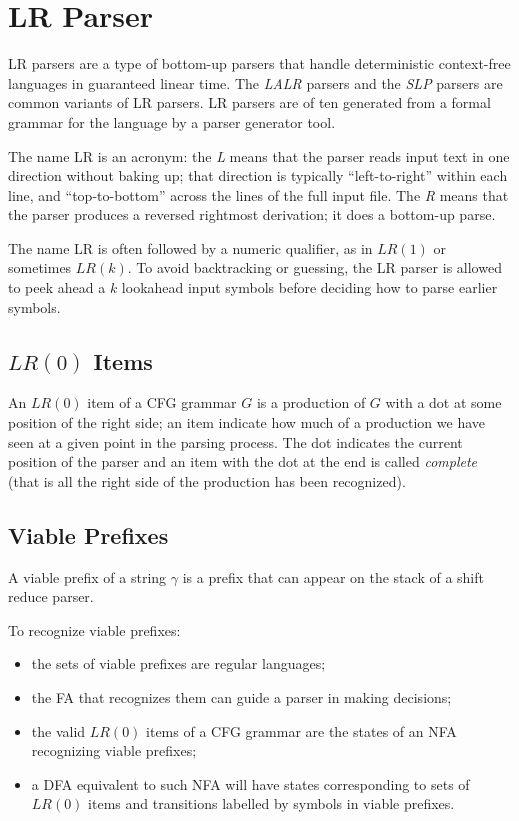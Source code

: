 \section{LR Parser}
LR parsers are a type of bottom-up parsers that handle deterministic context-free languages in guaranteed linear time.
The \emph{LALR} parsers and the \emph{SLP} parsers are common variants of LR parsers.
LR parsers are of ten generated from a formal grammar for the language by a parser generator tool.

The name LR is an acronym: the \emph{L} means that the parser reads input text in one direction without baking up; that direction is typically ``left-to-right'' within each line, and ``top-to-bottom'' across the lines of the full input file.
The \emph{R} means that the parser produces a reversed rightmost derivation; it does a bottom-up parse.

The name LR is often followed by a numeric qualifier, as in $LR(1)$ or sometimes $LR(k)$.
To avoid backtracking or guessing, the LR parser is allowed to peek ahead a $k$ lookahead input symbols before deciding how to parse earlier symbols.

\subsection{$LR(0)$ Items}
An $LR(0)$ item of a CFG grammar $G$ is a production of $G$ with a dot at some position of the right side; an item indicate how much of a production we have seen at a given point in the parsing process.
The dot indicates the current position of the parser and an item with the dot at the end is called \emph{complete} (that is all the right side of the production has been recognized).

\subsection{Viable Prefixes}
A viable prefix of a string $\gamma$ is a prefix that can appear on the stack of a shift reduce parser.

To recognize viable prefixes:
\begin{itemize}
	\item the sets of viable prefixes are regular languages;
	\item the FA that recognizes them can guide a parser in making decisions;
	\item the valid $LR(0)$ items of a CFG grammar are the states of an NFA recognizing viable prefixes;
	\item a DFA equivalent to such NFA will have states corresponding to sets of $LR(0)$ items and transitions labelled by symbols in viable prefixes.
\end{itemize}

